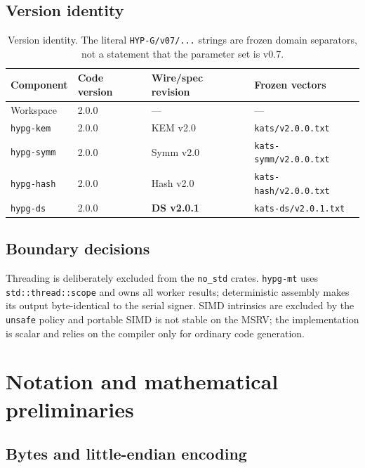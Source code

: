 \documentclass[runningheads]{llncs}
\begin{document}
\subsection{Version identity}

\begin{table}[t]
\centering
\small
\begin{tabular}{@{}llll@{}}
\toprule
Component & Code version & Wire/spec revision & Frozen vectors \\
\midrule
Workspace & 2.0.0 & --- & --- \\
\texttt{hypg-kem} & 2.0.0 & KEM v2.0 & \texttt{kats/v2.0.0.txt} \\
\texttt{hypg-symm} & 2.0.0 & Symm v2.0 & \texttt{kats-symm/v2.0.0.txt} \\
\texttt{hypg-hash} & 2.0.0 & Hash v2.0 & \texttt{kats-hash/v2.0.0.txt} \\
\texttt{hypg-ds} & 2.0.0 & \textbf{DS v2.0.1} & \texttt{kats-ds/v2.0.1.txt} \\
\bottomrule
\end{tabular}
\caption{Version identity.  The literal \texttt{HYP-G/v07/...} strings
are frozen domain separators, not a statement that the parameter set is
v0.7.}
\label{tab:versions}
\end{table}

\subsection{Boundary decisions}

Threading is deliberately excluded from the \texttt{no\_std} crates.
\texttt{hypg-mt} uses \texttt{std::thread::scope} and owns all worker
results; deterministic assembly makes its output byte-identical to the
serial signer.  SIMD intrinsics are excluded by the \texttt{unsafe}
policy and portable SIMD is not stable on the MSRV; the implementation
is scalar and relies on the compiler only for ordinary code generation.

\section{Notation and mathematical preliminaries}
\label{sec:notation}

\subsection{Bytes and little-endian encoding}
\end{document}
